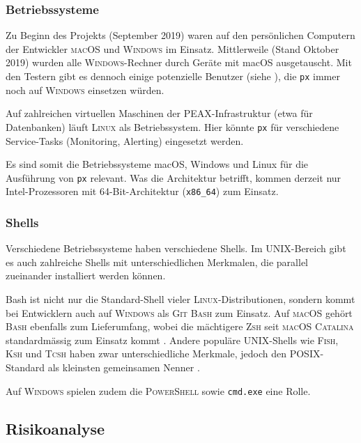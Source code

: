 \subsubsection{Betriebssysteme}

Zu Beginn des Projekts (September 2019) waren auf den persönlichen Computern der Entwickler \textsc{macOS} und \textsc{Windows} im Einsatz. Mittlerweile (Stand Oktober 2019) wurden alle \textsc{Windows}-Rechner durch Geräte mit macOS ausgetauscht. Mit den Testern gibt es dennoch einige potenzielle Benutzer (siehe ), die \texttt{px} immer noch auf \textsc{Windows} einsetzen würden.

Auf zahlreichen virtuellen Maschinen der PEAX-Infrastruktur (etwa für Datenbanken) läuft \textsc{Linux} als Betriebssystem. Hier könnte \texttt{px} für verschiedene Service-Tasks (Monitoring, Alerting) eingesetzt werden.

Es sind somit die Betriebssysteme macOS, Windows und Linux für die Ausführung von \texttt{px} relevant. Was die Architektur betrifft, kommen derzeit nur Intel-Prozessoren mit 64-Bit-Architektur (\texttt{x86\_64}) zum Einsatz.

\subsubsection{Shells} 

Verschiedene Betriebssysteme haben verschiedene Shells. Im UNIX-Bereich gibt es auch zahlreiche Shells mit unterschiedlichen Merkmalen, die parallel zueinander installiert werden können.

Bash ist nicht nur die Standard-Shell vieler \textsc{Linux}-Distributionen, sondern kommt bei Entwicklern auch auf \textsc{Windows} als \textsc{Git Bash} zum Einsatz. Auf \textsc{macOS} gehört \textsc{Bash} ebenfalls zum Lieferumfang, wobei die mächtigere \textsc{Zsh} seit \textsc{macOS Catalina} standardmässig zum Einsatz kommt \cite{macos-zsh}. Andere populäre \textsc{UNIX}-Shells wie \textsc{Fish}, \textsc{Ksh} und \textsc{Tcsh} haben zwar unterschiedliche Merkmale, jedoch den \textsc{POSIX}-Standard als kleinsten gemeinsamen Nenner \cite{posix-shell}.

Auf \textsc{Windows} spielen zudem die \textsc{PowerShell} sowie \texttt{cmd.exe} eine Rolle.

\subsection{Risikoanalyse}

